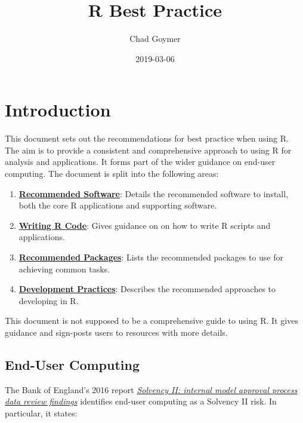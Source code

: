 \documentclass[]{book}
\title{R Best Practice}
\author{Chad Goymer}
\date{2019-03-06}
\providecommand{\tightlist}{%
  \setlength{\itemsep}{0pt}\setlength{\parskip}{0pt}}
\begin{document}
\maketitle

{
\setcounter{tocdepth}{1}
\tableofcontents
}
\hypertarget{introduction}{%
\chapter{Introduction}\label{introduction}}

This document sets out the recommendations for best practice when using R. The aim is to provide
a consistent and comprehensive approach to using R for analysis and applications. It forms
part of the wider guidance on end-user computing. The document is split into the following
areas:

\begin{enumerate}
\def\labelenumi{\arabic{enumi}.}
\tightlist
\item
  \textbf{\href{software.html}{Recommended Software}}: Details the recommended software to install, both
  the core R applications and supporting software.
\item
  \textbf{\href{writing.html}{Writing R Code}}: Gives guidance on on how to write R scripts and
  applications.
\item
  \textbf{\href{packages.html}{Recommended Packages}}: Lists the recommended packages to use for achieving
  common tasks.
\item
  \textbf{\href{development.html}{Development Practices}}: Describes the recommended approaches to
  developing in R.
\end{enumerate}

This document is not supposed to be a comprehensive guide to using R. It gives guidance
and sign-posts users to resources with more details.

\hypertarget{end-user-computing}{%
\section{End-User Computing}\label{end-user-computing}}

The Bank of England's 2016 report
\href{https://www.bankofengland.co.uk/-/media/boe/files/prudential-regulation/publication/solvency-ii-internal-model-approved-process-data-review-findings-09-02-2016.pdf?la=en\&hash=873ED57439F79A32D0F00D7255BC0E436E9F85E5}{\emph{Solvency II: internal model approval process data review findings}}
identifies end-user computing as a Solvency II risk. In particular, it states:
\end{document}
